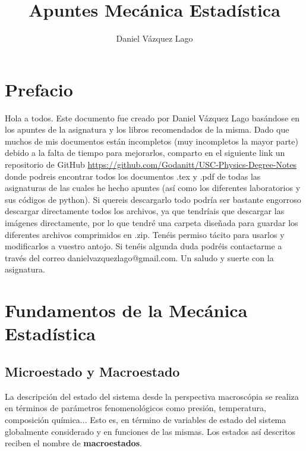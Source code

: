 \documentclass[12pt,a4paper]{article}
\title{Apuntes Mecánica Estadística}
\author{Daniel Vázquez Lago}
\numberwithin{equation}{section}
\numberwithin{figure}{section}
\theoremstyle{definition}
\begin{document}
\maketitle

\newpage

\tableofcontents

\newpage
\section*{Prefacio}

Hola a todos. Este documento fue creado por Daniel Vázquez Lago basándose en los apuntes de la asignatura y los libros recomendados de la misma. Dado que muchos de mis documentos están incompletos (muy incompletos la mayor parte) debido a la falta de tiempo para mejorarlos, comparto en el siguiente link un repositorio de GitHub \url{https://github.com/Godanitt/USC-Physics-Degree-Notes} donde podreis encontrar todos los documentos .tex y .pdf de todas las asignaturas de las cuales he hecho apuntes (así como los diferentes laboratorios y sus códigos de python). Si quereis descargarlo todo podría ser bastante engorroso descargar directamente todos los archivos, ya que tendríais que descargar las imágenes directamente, por lo que tendré una carpeta diseñada para guardar los diferentes archivos comprimidos en .zip. Tenéis permiso tácito para usarlos y modificarlos a vuestro antojo. Si tenéis algunda duda podréis contactarme a través del correo danielvazquezlago@gmail.com. Un saludo y suerte con la asignatura.

\newpage

\section{Fundamentos de la Mecánica Estadística}

\subsection{Microestado y Macroestado}

La descripción del estado del sistema desde la perspectiva macroscópia se realiza en términos de parámetros fenomenológicos como presión, temperatura, composición química... Esto es, en término de variables de estado del sistema globalmente considerado y en funciones de las mismas. Los estados así descritos reciben el nombre de \textbf{macroestados}. \\
\end{document}

